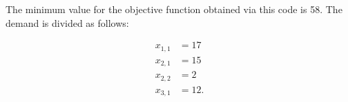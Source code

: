 

The minimum value for the objective function obtained via this code is 58. The
demand is divided as follows:

\begin{align*}
	x_{1,1} &= 17 \\
	x_{2,1} &= 15 \\
	x_{2,2} &= 2 \\
	x_{3,1} &= 12
.\end{align*}

